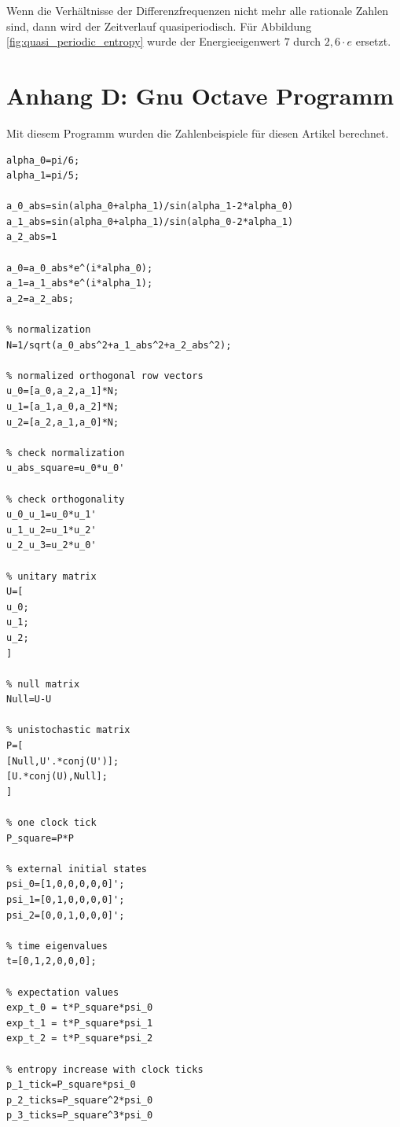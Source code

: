 \documentclass[12pt]{article}
\begin{document}
Wenn die Verhältnisse der Differenzfrequenzen nicht mehr alle rationale Zahlen sind, dann wird der Zeitverlauf quasiperiodisch. Für Abbildung \ref{fig:quasi_periodic_entropy} wurde der Energieeigenwert $7$ durch $2,6 \cdot e$ ersetzt.

\newpage
\section{Anhang D: Gnu Octave Programm}
Mit diesem Programm wurden die Zahlenbeispiele für diesen Artikel berechnet.
\begin{verbatim}
alpha_0=pi/6;
alpha_1=pi/5;

a_0_abs=sin(alpha_0+alpha_1)/sin(alpha_1-2*alpha_0)
a_1_abs=sin(alpha_0+alpha_1)/sin(alpha_0-2*alpha_1)
a_2_abs=1

a_0=a_0_abs*e^(i*alpha_0);
a_1=a_1_abs*e^(i*alpha_1);
a_2=a_2_abs;

% normalization
N=1/sqrt(a_0_abs^2+a_1_abs^2+a_2_abs^2);

% normalized orthogonal row vectors
u_0=[a_0,a_2,a_1]*N;
u_1=[a_1,a_0,a_2]*N;
u_2=[a_2,a_1,a_0]*N;

% check normalization
u_abs_square=u_0*u_0'

% check orthogonality
u_0_u_1=u_0*u_1'
u_1_u_2=u_1*u_2'
u_2_u_3=u_2*u_0'

% unitary matrix
U=[
u_0;
u_1;
u_2;
]

% null matrix
Null=U-U

% unistochastic matrix
P=[
[Null,U'.*conj(U')];
[U.*conj(U),Null];
]

% one clock tick
P_square=P*P

% external initial states
psi_0=[1,0,0,0,0,0]';
psi_1=[0,1,0,0,0,0]';
psi_2=[0,0,1,0,0,0]';

% time eigenvalues
t=[0,1,2,0,0,0];

% expectation values
exp_t_0 = t*P_square*psi_0
exp_t_1 = t*P_square*psi_1
exp_t_2 = t*P_square*psi_2

% entropy increase with clock ticks
p_1_tick=P_square*psi_0
p_2_ticks=P_square^2*psi_0
p_3_ticks=P_square^3*psi_0
\end{verbatim}
\end{document}

